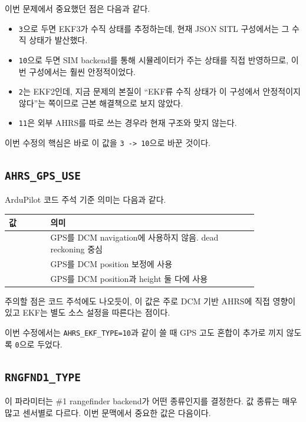 \documentclass[11pt]{article}
\begin{document}
이번 문제에서 중요했던 점은 다음과 같다.

\begin{itemize}[leftmargin=1.5em]
\item \texttt{3}으로 두면 EKF3가 수직 상태를 추정하는데,
      현재 JSON SITL 구성에서는 그 수직 상태가 발산했다.
\item \texttt{10}으로 두면 SIM backend를 통해 시뮬레이터가 주는 상태를
      직접 반영하므로, 이번 구성에서는 훨씬 안정적이었다.
\item \texttt{2}는 EKF2인데, 지금 문제의 본질이 ``EKF류 수직 상태가 이 구성에서
      안정적이지 않다''는 쪽이므로 근본 해결책으로 보지 않았다.
\item \texttt{11}은 외부 AHRS를 따로 쓰는 경우라 현재 구조와 맞지 않는다.
\end{itemize}

이번 수정의 핵심은 바로 이 값을 \texttt{3 -> 10}으로 바꾼 것이다.

\subsection{\texttt{AHRS\_GPS\_USE}}

ArduPilot 코드 주석 기준 의미는 다음과 같다.

\begin{center}
\begin{tabular}{>{\ttfamily}p{0.14\linewidth} p{0.70\linewidth}}
\toprule
값 & 의미 \\
\midrule
0 & GPS를 DCM navigation에 사용하지 않음. dead reckoning 중심 \\
1 & GPS를 DCM position 보정에 사용 \\
2 & GPS를 DCM position과 height 둘 다에 사용 \\
\bottomrule
\end{tabular}
\end{center}

주의할 점은 코드 주석에도 나오듯이, 이 값은 주로 DCM 기반 AHRS에 직접 영향이
있고 EKF는 별도 소스 설정을 따른다는 점이다.

이번 수정에서는 \texttt{AHRS\_EKF\_TYPE=10}과 같이 쓸 때 GPS 고도 혼합이
추가로 끼지 않도록 \texttt{0}으로 두었다.

\subsection{\texttt{RNGFND1\_TYPE}}

이 파라미터는 \#1 rangefinder backend가 어떤 종류인지를 결정한다.
값 종류는 매우 많고 센서별로 다르다. 이번 문맥에서 중요한 값은 다음이다.
\end{document}
